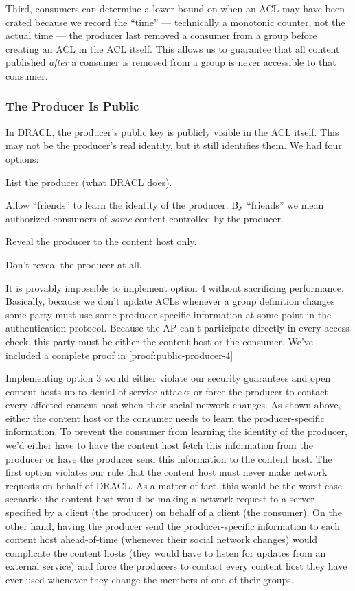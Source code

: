 \documentclass[pdftex,12pt,a4papaer,twoside,notitlepage]{report}
\begin{document}
Third, consumers can determine a lower bound on when an ACL may have been crated
because we record the ``time'' --- technically a monotonic counter, not the
actual time --- the producer last removed a consumer from a group before creating
an ACL in the ACL itself. This allows us to guarantee that all content published
\emph{after} a consumer is removed from a group is never accessible to that
consumer.

\subsubsection{The Producer Is Public}
\label{sec:producer_public}

In DRACL, the producer's public key is publicly visible in the ACL itself. This
may not be the producer's real identity, but it still identifies them. We had
four options:

\begin{compactenum}
\item List the producer (what DRACL does).
\item Allow ``friends'' to learn the identity of the producer. By ``friends'' we
  mean authorized consumers of \emph{some} content controlled by the producer.
\item Reveal the producer to the content host only.
\item Don't reveal the producer at all.
\end{compactenum}

It is provably impossible to implement option 4 without sacrificing performance.
Basically, because we don't update ACLs whenever a group definition changes some
party must use some producer-specific information at some point in the
authentication protocol. Because the AP can't participate directly in every
access check, this party must be either the content host or the consumer. We've
included a complete proof in \cref{proof:public-producer-4}

Implementing option 3 would either violate our security guarantees and open
content hosts up to denial of service attacks or force the producer to contact
every affected content host when their social network changes. As shown above,
either the content host or the consumer needs to learn the producer-specific
information. To prevent the consumer from learning the identity of the producer,
we'd either have to have the content host fetch this information from the
producer or have the producer send this information to the content host. The
first option violates our rule that the content host must never make network
requests on behalf of DRACL\@. As a matter of fact, this would be the worst case
scenario: the content host would be making a network request to a server
specified by a client (the producer) on behalf of a client (the consumer). On
the other hand, having the producer send the producer-specific information to
each content host ahead-of-time (whenever their social network changes) would
complicate the content hosts (they would have to listen for updates from an
external service) and force the producers to contact every content host they
have ever used whenever they change the members of one of their groups.
\end{document}
